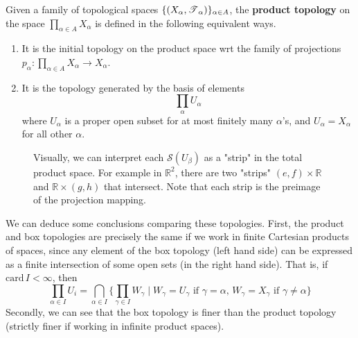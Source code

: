   \begin{definition} 
    \label{def:product-topology}
    Given a family of topological spaces $\{(X_\alpha, \operatorname{\mathscr{T}}_\alpha)\}_{\alpha \in A}$, the \textbf{product topology} on the space $\prod_{\alpha \in A} X_\alpha$ is defined in the following equivalent ways. 
    \begin{enumerate}
      \item It is the initial topology on the product space wrt the family of projections $p_\alpha: \prod_{\alpha \in A} X_\alpha \rightarrow X_\alpha$. 

      \item It is the topology generated by the basis of elements 
      \begin{equation}
        \prod_\alpha U_\alpha 
      \end{equation}
      where $U_\alpha$ is a proper open subset for at most finitely many $\alpha$'s, and $U_\alpha = X_\alpha$ for all other $\alpha$. 
    \end{enumerate}

    \begin{figure}[H]
      \centering 
      \caption{Visually, we can interpret each $\mathscr{S} (U_\beta)$ as a "strip" in the total product space. For example in $\mathbb{R}^2$, there are two "strips" $(e, f) \times \mathbb{R}$ and $\mathbb{R} \times (g, h)$ that intersect. Note that each strip is the preimage of the projection mapping. }
      \label{fig:product_topology}
    \end{figure}
  \end{definition}

  We can deduce some conclusions comparing these topologies. First, the product and box topologies are precisely the same if we work in finite Cartesian products of spaces, since any element of the box topology (left hand side) can be expressed as a finite intersection of some open sets (in the right hand side). That is, if $\text{card}\,I < \infty$, then 
  \begin{equation}
    \prod_{\alpha \in I} U_i = \bigcap_{\alpha \in I} \big\{ \prod_{\gamma \in I} W_\gamma \mid W_\gamma = U_\gamma \text{ if } \gamma = \alpha, \, W_\gamma = X_\gamma \text{ if } \gamma \neq \alpha\big\}
  \end{equation}
  Secondly, we can see that the box topology is finer than the product topology (strictly finer if working in infinite product spaces). 

